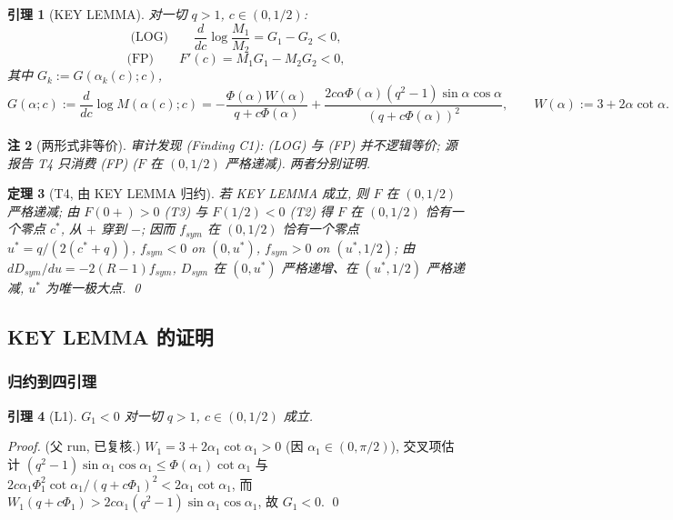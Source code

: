 \documentclass[UTF8]{ctexart}
\newtheorem{theorem}{定理}[section]
\newtheorem{lemma}[theorem]{引理}
\newtheorem{remark}[theorem]{注}
\begin{document}
\begin{lemma}[KEY LEMMA]
\label{lem:keylemma}
对一切 $q>1$, $c\in(0,1/2)$:
\begin{equation}
	\text{(LOG)}\qquad \frac{d}{dc}\log\frac{M_1}{M_2}=G_1-G_2<0,
\end{equation}
\begin{equation}
	\text{(FP)}\qquad F'(c)=M_1G_1-M_2G_2<0,
\end{equation}
其中 $G_k:=G(\alpha_k(c);c)$,
\begin{equation}
	G(\alpha;c):=\frac{d}{dc}\log M(\alpha(c);c)
	=-\frac{\Phi(\alpha)W(\alpha)}{q+c\Phi(\alpha)}
	+\frac{2c\alpha\Phi(\alpha)(q^2-1)\sin\alpha\cos\alpha}{(q+c\Phi(\alpha))^2},
	\qquad W(\alpha):=3+2\alpha\cot\alpha.
\end{equation}
\end{lemma}

\begin{remark}[两形式非等价]
审计发现 (Finding C1): (LOG) 与 (FP) 并不逻辑等价; 源报告 T4 只消费 (FP)
($F$ 在 $(0,1/2)$ 严格递减). 两者分别证明.
\end{remark}

\begin{theorem}[T4, 由 KEY LEMMA 归约]
\label{thm:T4}
若 KEY LEMMA 成立, 则 $F$ 在 $(0,1/2)$ 严格递减; 由 $F(0+)>0$ (T3) 与
$F(1/2)<0$ (T2) 得 $F$ 在 $(0,1/2)$ 恰有一个零点 $c^*$, 从 $+$ 穿到 $-$; 因而
$f_{sym}$ 在 $(0,1/2)$ 恰有一个零点 $u^*=q/(2(c^*+q))$, $f_{sym}<0$ on $(0,u^*)$,
$f_{sym}>0$ on $(u^*,1/2)$; 由 $dD_{sym}/du=-2(R-1)f_{sym}$,
$D_{sym}$ 在 $(0,u^*)$ 严格递增、在 $(u^*,1/2)$ 严格递减, $u^*$ 为唯一极大点. \qed
\end{theorem}

\subsection{KEY LEMMA 的证明}

\subsubsection{归约到四引理}
\begin{lemma}[L1]
$G_1<0$ 对一切 $q>1$, $c\in(0,1/2)$ 成立.
\end{lemma}
\begin{proof}
(父 run, 已复核.) $W_1=3+2\alpha_1\cot\alpha_1>0$ (因 $\alpha_1\in(0,\pi/2)$),
交叉项估计 $(q^2-1)\sin\alpha_1\cos\alpha_1\le\Phi(\alpha_1)\cot\alpha_1$ 与
$2c\alpha_1\Phi_1^2\cot\alpha_1/(q+c\Phi_1)^2<2\alpha_1\cot\alpha_1$, 而
$W_1(q+c\Phi_1)>2c\alpha_1(q^2-1)\sin\alpha_1\cos\alpha_1$, 故 $G_1<0$. \qed
\end{proof}
\end{document}
